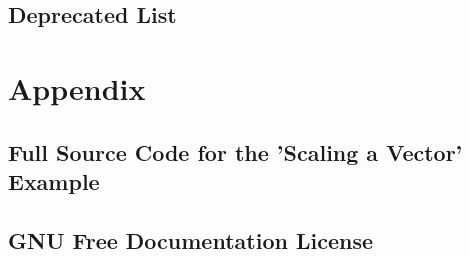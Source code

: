 \documentclass{book}
\begin{document}
%
%
















\chapter{Deprecated List}
\label{deprecated}
\hypertarget{deprecated}{}



\printindex

\part{Appendix}

\chapter{Full Source Code for the ’Scaling a Vector’ Example}
\label{FullSourceCodeVectorScal}
\hypertarget{FullSourceCodeVectorScal}{}


\chapter{GNU Free Documentation License}
\label{GNUFreeDocumentationLicense}
\hypertarget{GNUFreeDocumentationLicense}{}

\end{document}
